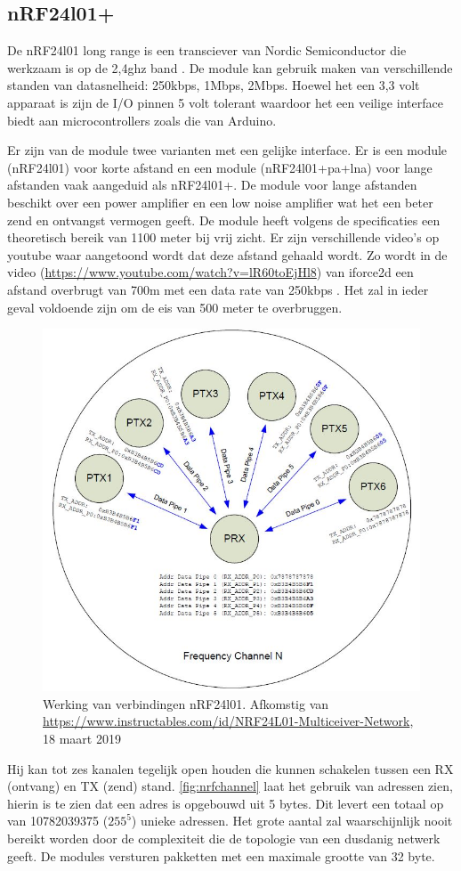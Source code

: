 \documentclass[a4paper, 11pt, oneside]{report}
\begin{document}
\subsection{nRF24l01+}
De nRF24l01 long range is een transciever van Nordic Semiconductor die werkzaam is op de 2,4ghz band \cite{nRFspec}.
De module kan gebruik maken van verschillende standen van datasnelheid: 250kbps, 1Mbps, 2Mbps.
Hoewel het een 3,3 volt apparaat is zijn de I/O pinnen 5 volt tolerant waardoor het een veilige interface biedt aan microcontrollers zoals die van Arduino.

Er zijn van de module twee varianten met een gelijke interface. 
Er is een module (nRF24l01) voor korte afstand en een module (nRF24l01+pa+lna) voor lange afstanden vaak aangeduid als nRF24l01+.
De module voor lange afstanden beschikt over een power amplifier en een low noise amplifier wat het een beter zend en ontvangst vermogen geeft.
De module heeft volgens de specificaties een theoretisch bereik van 1100 meter bij vrij zicht.
Er zijn verschillende video's op youtube waar aangetoond wordt dat deze afstand gehaald wordt.
Zo wordt in de video (\href{https://www.youtube.com/watch?v=lR60toEjHl8}{https://www.youtube.com/watch?v=lR60toEjHl8}) van iforce2d een afstand overbrugt van 700m met een data rate van 250kbps \cite{nrfAfstand}.
Het zal in ieder geval voldoende zijn om de eis van 500 meter te overbruggen.  

\begin{figure}[H]
	\begin{center}\includegraphics[width=0.4\linewidth]{Afbeeldingen/nrfMulticiever.jpg}\end{center}
	\caption{Werking van verbindingen nRF24l01. Afkomstig van \href{https://www.instructables.com/id/NRF24L01-Multiceiver-Network}{https://www.instructables.com/id/NRF24L01-Multiceiver-Network}, 18 maart 2019}
	\label{fig:nrfchannel}
\end{figure}
Hij kan tot zes kanalen tegelijk open houden die kunnen schakelen tussen een RX (ontvang) en TX (zend) stand. 
\autoref{fig:nrfchannel} laat het gebruik van adressen zien, hierin is te zien dat een adres is opgebouwd uit 5 bytes.
Dit levert een totaal op van 10782039375 ($255^{5}$) unieke adressen.
Het grote aantal zal waarschijnlijk nooit bereikt worden door de complexiteit die de topologie van een dusdanig netwerk geeft.
De modules versturen pakketten met een maximale grootte van 32 byte.
\end{document}
